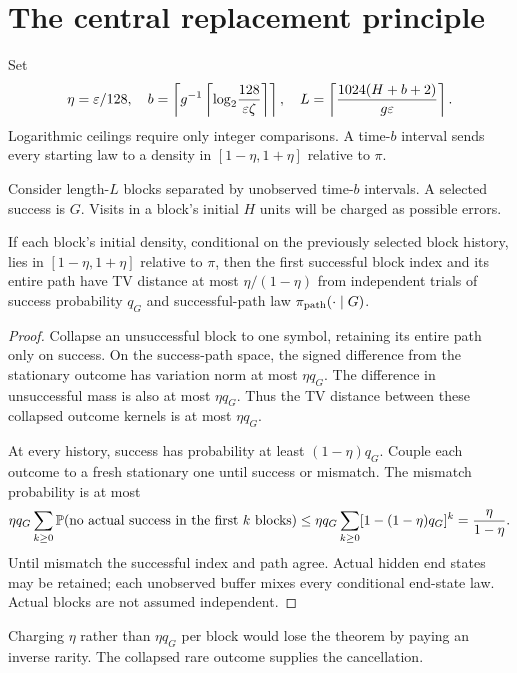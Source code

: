 \section{The central replacement principle}
Set
\begin{equation}
\eta=\varepsilon/128,\quad
b=\left\lceil g^{-1}\left\lceil\log_2\!\frac{128}{\varepsilon\zeta}\right\rceil\right\rceil,\quad
L=\left\lceil\frac{1024(H+b+2)}{g\varepsilon}\right\rceil. \label{eq:parameters}
\end{equation}
Logarithmic ceilings require only integer comparisons. A time-$b$ interval sends every starting law to a density in $[1-\eta,1+\eta]$ relative to $\pi$.

Consider length-$L$ blocks separated by unobserved time-$b$ intervals. A selected success is $G$. Visits in a block's initial $H$ units will be charged as possible errors.

\begin{lemma}\label{lem:replace}
If each block's initial density, conditional on the previously selected block history, lies in $[1-\eta,1+\eta]$ relative to $\pi$, then the first successful block index and its entire path have TV distance at most $\eta/(1-\eta)$ from independent trials of success probability $q_G$ and successful-path law $\pi_{\rm path}(\cdot\mid G)$.
\end{lemma}
\begin{proof}
Collapse an unsuccessful block to one symbol, retaining its entire path only on success. On the success-path space, the signed difference from the stationary outcome has variation norm at most $\eta q_G$. The difference in unsuccessful mass is also at most $\eta q_G$. Thus the TV distance between these collapsed outcome kernels is at most $\eta q_G$.

At every history, success has probability at least $(1-\eta)q_G$. Couple each outcome to a fresh stationary one until success or mismatch. The mismatch probability is at most
\[
\eta q_G\sum_{k\ge0}
\mathbb P(\text{no actual success in the first }k\text{ blocks})
\le\eta q_G\sum_{k\ge0}[1-(1-\eta)q_G]^k
=\frac{\eta}{1-\eta}.
\]
Until mismatch the successful index and path agree. Actual hidden end states may be retained; each unobserved buffer mixes every conditional end-state law. Actual blocks are not assumed independent.
\end{proof}

Charging $\eta$ rather than $\eta q_G$ per block would lose the theorem by paying an inverse rarity. The collapsed rare outcome supplies the cancellation.

